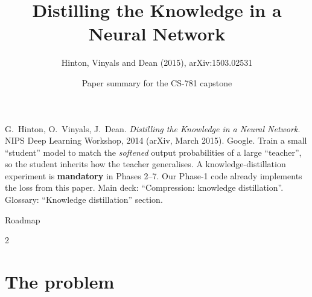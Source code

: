 \documentclass[aspectratio=169,11pt]{beamer}
\title[Knowledge Distillation]{Distilling the Knowledge in a Neural Network}
\subtitle{Hinton, Vinyals and Dean (2015), arXiv:1503.02531}
\author[Paper summary]{Paper summary for the CS-781 capstone}
\date{}
\begin{document}
\begin{frame}\titlepage\end{frame}

\paperglance
{G.\ Hinton, O.\ Vinyals, J.\ Dean. \emph{Distilling the Knowledge in a Neural Network}. NIPS Deep Learning Workshop, 2014 (arXiv, March 2015). Google.}
{Train a small ``student'' model to match the \emph{softened} output probabilities of a large ``teacher'', so the student inherits how the teacher generalises.}
{A knowledge-distillation experiment is \textbf{mandatory} in Phases 2--7. Our Phase-1 code already implements the loss from this paper.}
{Main deck: ``Compression: knowledge distillation''. Glossary: ``Knowledge distillation'' section.}

\begin{frame}{Roadmap}
  \begin{multicols}{2}\small\tableofcontents\end{multicols}
\end{frame}

\section{The problem}
\end{document}

